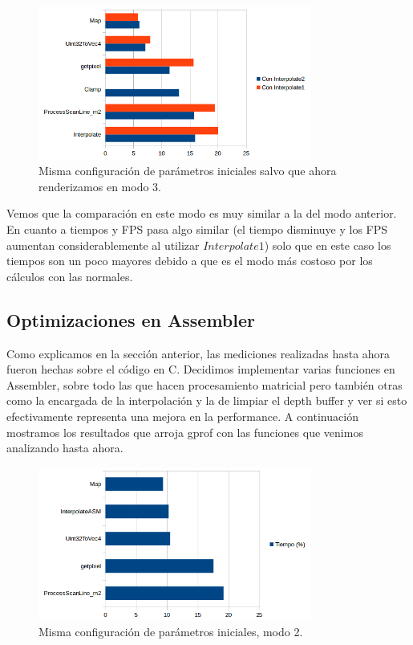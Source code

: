 \documentclass[a4paper]{article}
\begin{document}
\begin{figure}[H]
    \centering
    \includegraphics[width=0.8\textwidth]{Imagenes/gprof3.png}
    \caption{Misma configuración de parámetros iniciales salvo que ahora renderizamos en modo 3.}
    \label{fig:mesh1}
\end{figure}

Vemos que la comparación en este modo es muy similar a la del modo anterior. En cuanto a tiempos y FPS pasa algo similar (el tiempo disminuye y los FPS aumentan considerablemente al utilizar $Interpolate1$) solo que en este caso los tiempos son un poco mayores debido a que es el modo más costoso por los cálculos con las normales.

\subsection{Optimizaciones en Assembler}
Como explicamos en la sección anterior, las mediciones realizadas hasta ahora fueron hechas sobre el código en C. Decidimos implementar varias funciones en Assembler, sobre todo las que hacen procesamiento matricial pero también otras como la encargada de la interpolación y la de limpiar el depth buffer y ver si esto efectivamente representa una mejora en la performance. A continuación mostramos los resultados que arroja gprof con las funciones que venimos analizando hasta ahora.

\begin{figure}[H]
    \centering
    \includegraphics[width=0.8\textwidth]{Imagenes/gprof4.png}
    \caption{Misma configuración de parámetros iniciales, modo 2.}
    \label{fig:mesh1}
\end{figure}
\end{document}
